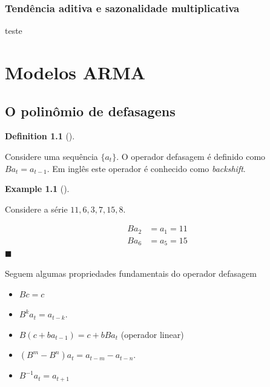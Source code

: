 \documentclass[
  letterpaper,
  DIV=11,
  numbers=noendperiod]{scrartcl}
\providecommand{\tightlist}{%
  \setlength{\itemsep}{0pt}\setlength{\parskip}{0pt}}
\theoremstyle{definition}
\newtheorem{example}{Example}[chapter]
\theoremstyle{definition}
\newtheorem{definition}{Definition}[chapter]
\theoremstyle{plain}
\theoremstyle{plain}
\theoremstyle{remark}
\begin{document}
\subsection{Tendência aditiva e sazonalidade
multiplicativa}\label{tenduxeancia-aditiva-e-sazonalidade-multiplicativa}

teste


\chapter{Modelos ARMA}\label{modelos-arma}

\section{O polinômio de defasagens}\label{o-polinuxf4mio-de-defasagens}

\begin{definition}[]\protect\hypertarget{def-}{}\label{def-}

Considere uma sequência \(\{a_t\}\). O operador defasagem é definido
como \(Ba_t = a_{t-1}\). Em inglês este operador é conhecido como
\emph{backshift}.

\end{definition}

\begin{example}[]\protect\hypertarget{exm-example}{}\label{exm-example}

Considere a série \(11,6,3,7,15,8\).

\begin{align*}
     Ba_2 &= a_{1}=11\\
     B a_6& =a_5 =15
    \end{align*} \(\blacksquare\)

\end{example}

Seguem algumas propriedades fundamentais do operador defasagem

\begin{itemize}
\tightlist
\item
  \(Bc=c\)
\item
  \(B^k a_t=a_{t-k}\).
\item
  \(B(c+ba_{t-1})=c+bBa_t\) (operador linear)
\item
  \((B^m - B^n)a_t = a_{t-m}-a_{t-n}.\)
\item
  \(B^{-1}a_t = a_{t+1}\)
\end{itemize}
\end{document}
